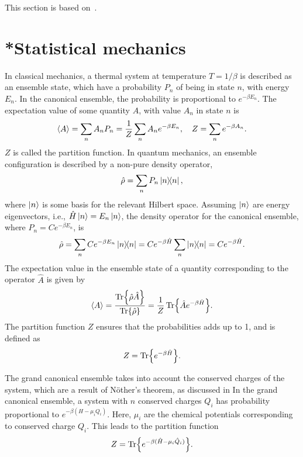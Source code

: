 This section is based on~\autocite{kapustaFiniteTemperatureFieldTheory2006,laineBasicsThermalField2016}.

\section{*Statistical mechanics}
\label{section:statistical mechanics}

In classical mechanics, a thermal system at temperature $T = 1 / \beta$ is described as an ensemble state, which have a probability $P_n$ of being in state $n$, with energy $E_n$.
In the canonical ensemble, the probability is proportional to $e^{-\beta E_n}$.
The expectation value of some quantity $A$, with value $A_n$ in state $n$ is
\begin{equation*}
    \left\langle A \right\rangle 
    = \sum_n A_n P_n = \frac{1}{Z} \sum_n A_n e^{- \beta E_n}, \quad 
    Z  = \sum_n e^{-\beta A_n}.
\end{equation*}
$Z$ is called the partition function. In quantum mechanics, an ensemble configuration is described by a non-pure density operator,
\begin{equation*}
    \hat \rho = \sum_n P_n \ketbra{n}{n},
\end{equation*}
where $\ket{n}$ is some basis for the relevant Hilbert space. Assuming $\ket{n}$ are energy eigenvectors, i.e., $\hat H \ket{n} = E_n \ket{n}$, the density operator for the canonical ensemble, where $P_n = Ce^{-\beta E_n}$, is
\begin{equation*}
    \hat \rho 
    = \sum_n C e^{-\beta E_n} \ketbra{n}{n} 
    = C e^{-\beta \hat H} \sum_n \ketbra{n}{n} 
    = C e^{-\beta \hat H}.
\end{equation*}
The expectation value in the ensemble state of a quantity corresponding to the operator $\hat A$ is given by
\begin{align}
    \left\langle A \right\rangle = \frac{ \Tr{\hat \rho \hat A} }{\Tr{\hat \rho }}
    = \frac{1}{Z} \Tr{\hat A e^{-\beta \hat H}}.
\end{align}
The partition function $Z$ ensures that the probabilities adds up to 1, and is defined as
\begin{equation}
    Z = \Tr{e^{-\beta \hat H}}.
\end{equation}

The grand canonical ensemble takes into account the conserved charges of the system, which are a result of Nöther's theorem, as discussed in 
In the grand canonical ensemble, a system with $n$ conserved charges $Q_i$ has probability proportional to $e^{-\beta (H - \mu_i Q_i)}$.
Here, $\mu_i$ are the chemical potentials corresponding to conserved charge $Q_i$.
This leads to the partition function
\begin{equation}
    Z = \Tr{e^{-\beta(\hat H - \mu_i \hat Q_i)}}.
\end{equation}



